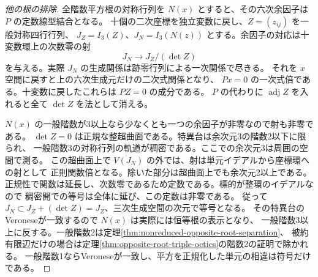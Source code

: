 \begin{proof}[他の根の排除]
全階数平方根の対称行列を $N(x)$ とすると、その六次余因子は $P$ の定数線型結合となる。
十個の二次座標を独立変数に戻し、$Z=(z_{ij})$ を一般対称四行行列、
$J_Z=I_3(Z)$、$J_N=I_3(N(z))$ とする。余因子の対応は十変数環上の次数零の射
\[
                    J_N\longrightarrow J_Z/(\det Z)
\]
を与える。実際 $J_N$ の生成関係は跡零行列による一次関係で尽きる。
それを $x$ 空間に戻すと上の六次生成元だけの二次式関係となり、
$Px=0$ の一次式倍である。十変数に戻したこれらは $P Z=0$ の成分である。
$P$ の代わりに $\operatorname{adj}Z$ を入れると全て $\det Z$ を法として消える。

$N(x)$ の一般階数が3以上なら少なくとも一つの余因子が非零なので射も非零である。
$\det Z=0$ は正規な整超曲面である。特異台は余次元3の階数2以下に限られ、
一般階数3の対称行列の軌道が稠密である。ここでの余次元3は周囲の空間で測る。
この超曲面上で $V(J_N)$ の外では、射は単元イデアルから座標環への射として
正則関数倍となる。除いた部分は超曲面上でも余次元2以上である。
正規性で関数は延長し、次数零であるため定数である。標的が整環のイデアルなので
稠密開での等号は全体に延び、この定数は非零である。
従って $J_N\subset J_Z+(\det Z)=J_Z$、三次生成空間の次元で等号となる。
その特異台のVeroneseが一致するので $N(x)$ は実際には恒等根の表示となり、
一般階数3以上に反する。一般階数2は定理\ref{thm:nonreduced-opposite-root-separation}、
被約有限辺だけの場合は定理\ref{thm:opposite-root-triple-octics}の階数2の証明で除かれる。
一般階数1ならVeroneseが一致し、平方を正規化した単元の相違は符号だけである。
\end{proof}

